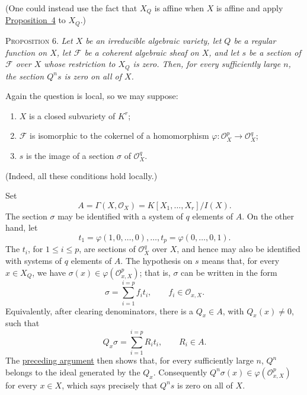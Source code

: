 (One could instead use the fact that $X_Q$ is affine when $X$ is affine and apply \hyperref[fac:II:3:no:43:prop:4]{Proposition~4} to $X_Q$.)

\label{fac:II:3:no:43:prop:6}
\textsc{Proposition 6.} \textit{Let $X$ be an irreducible algebraic variety, let $Q$ be a regular function on $X$, let $\mathcal{F}$ be a coherent algebraic sheaf on $X$, and let $s$ be a section of $\mathcal{F}$ over $X$ whose restriction to $X_Q$ is zero. Then, for every sufficiently large $n$, the section $Q^ns$ is zero on all of $X$.}

Again the question is local, so we may suppose:

\begin{enumerate}
\item[(a)]\label{fac:II:3:no:43:prop:6:item:a} $X$ is a closed subvariety of $K^r$;
\item[(b)]\label{fac:II:3:no:43:prop:6:item:b} $\mathcal{F}$ is isomorphic to the cokernel of a homomorphism $\varphi:\mathcal{O}_X^p\to\mathcal{O}_X^q$;
\item[(c)]\label{fac:II:3:no:43:prop:6:item:c} $s$ is the image of a section $\sigma$ of $\mathcal{O}_X^q$.
\end{enumerate}

(Indeed, all these conditions hold locally.)

Set
\[
A=\Gamma(X,\mathcal{O}_X)=K[X_1,\ldots,X_r]/I(X).
\]
The section $\sigma$ may be identified with a system of $q$ elements of $A$. On the other hand, let
\[
t_1=\varphi(1,0,\ldots,0),\ldots,
t_p=\varphi(0,\ldots,0,1).
\]
\label{fac:II:3:no:43:prop:6:proof:denominator-clearing}
The $t_i$, for $1\leq i\leq p$, are sections of $\mathcal{O}_X^q$ over $X$, and hence may also be identified with systems of $q$ elements of $A$. The hypothesis on $s$ means that, for every $x\in X_Q$, we have $\sigma(x)\in\varphi(\mathcal{O}_{x,X}^p)$; that is, $\sigma$ can be written in the form
\[
\sigma=\sum_{i=1}^{i=p}f_it_i,
\qquad f_i\in\mathcal{O}_{x,X}.
\]
Equivalently, after clearing denominators, there is a $Q_x\in A$, with $Q_x(x)\neq0$, such that
\[
Q_x\sigma=\sum_{i=1}^{i=p}R_it_i,
\qquad R_i\in A.
\]
The \hyperref[fac:II:3:no:43:prop:6:proof:denominator-clearing]{preceding argument} then shows that, for every sufficiently large $n$, $Q^n$ belongs to the ideal generated by the $Q_x$. Consequently $Q^n\sigma(x)\in\varphi(\mathcal{O}_{x,X}^p)$ for every $x\in X$, which says precisely that $Q^ns$ is zero on all of $X$.

